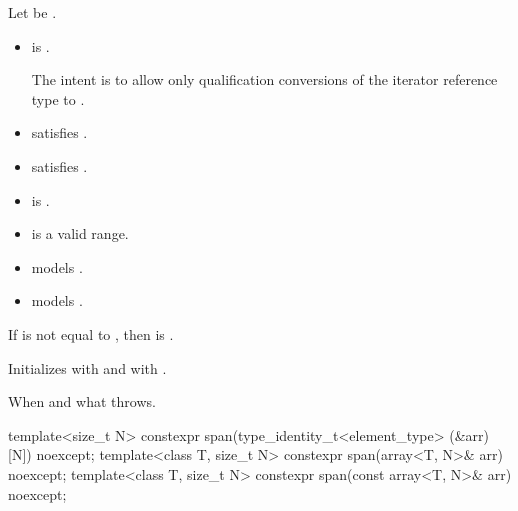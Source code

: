 \begin{itemdescr}
\pnum
\constraints
Let  be .
\begin{itemize}
\item
{} is .
\begin{note}
The intent is to allow only qualification conversions
of the iterator reference type to .
\end{note}
\item {} satisfies .
\item {} satisfies .
\item {} is .
\end{itemize}

\pnum
\expects
\begin{itemize}
\item {} is a valid range.
\item {} models .
\item {} models .
\end{itemize}

\pnum
\hardexpects
If  is not equal to ,
then  is .

\pnum
\effects
Initializes  with  and
 with .

\pnum
\throws
When and what  throws.
\end{itemdescr}

%
\begin{itemdecl}
template<size_t N> constexpr span(type_identity_t<element_type> (&arr)[N]) noexcept;
template<class T, size_t N> constexpr span(array<T, N>& arr) noexcept;
template<class T, size_t N> constexpr span(const array<T, N>& arr) noexcept;
\end{itemdecl}

